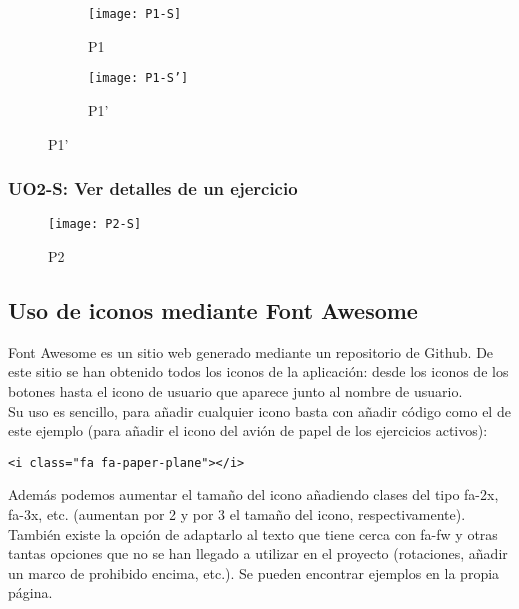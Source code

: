 \begin{figure}[H]
\begin{subfigure}[b]{0.3\textwidth}
	\centering
	\texttt{[image: P1-S]}
	\caption{P1}
	\label{diseno-e-implementacion:interfaces:alumno:p1}
\end{subfigure}
%
\begin{subfigure}[b]{0.3\textwidth}
	\centering
	\texttt{[image: P1-S']}
	\caption{P1'}
	\label{diseno-e-implementacion:interfaces:alumno:p1'}
\end{subfigure}

\label{fig:p1-student}
\end{figure}

\subsubsection{UO2-S: Ver detalles de un ejercicio}
\label{diseno-e-implementacion:interfaces:alumno:uo2-s}

\begin{figure}[H]
	\centering
	\texttt{[image: P2-S]}
	\caption{P2}
	\label{diseno-e-implementacion:interfaces:alumno:p1}
\end{figure}

\subsection{Uso de iconos mediante Font Awesome}
\label{diseno-e-implementacion:interfaces:font-awesome}

Font Awesome \hyperref[fontawesome]{\cite{fontawesome}} es un sitio web generado mediante un repositorio de Github. De este sitio se han obtenido todos los iconos de la aplicación: desde los iconos de los botones hasta el icono de usuario que aparece junto al nombre de usuario.\\

Su uso es sencillo, para añadir cualquier icono basta con añadir código como el de este ejemplo (para añadir el icono del avión de papel de los ejercicios activos):\\

\begin{lstlisting}[frame=single]
<i class="fa fa-paper-plane"></i>
\end{lstlisting}

Además podemos aumentar el tamaño del icono añadiendo clases del tipo fa-2x, fa-3x, etc. (aumentan por 2 y por 3 el tamaño del icono, respectivamente). También existe la opción de adaptarlo al texto que tiene cerca con fa-fw y otras tantas opciones que no se han llegado a utilizar en el proyecto (rotaciones, añadir un marco de prohibido encima, etc.). Se pueden encontrar ejemplos en la propia página.\\

